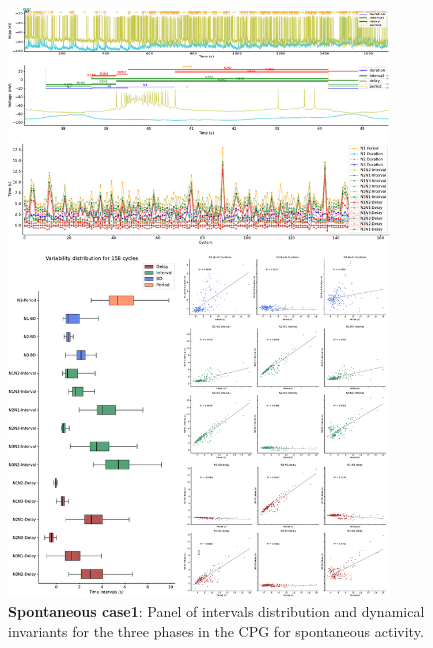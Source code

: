 \begin{figure}[htbp]
	\centering
	\includegraphics[width=0.9\textwidth]{./invariants/data/SUSSEX/prep1/images/3phases/panel_with_intervals.pdf}
	\caption{\textbf{Spontaneous case1}: Panel of intervals distribution and dynamical invariants for the three phases in the CPG for spontaneous activity.}
	\label{fig:prep1 invariants}
\end{figure}


